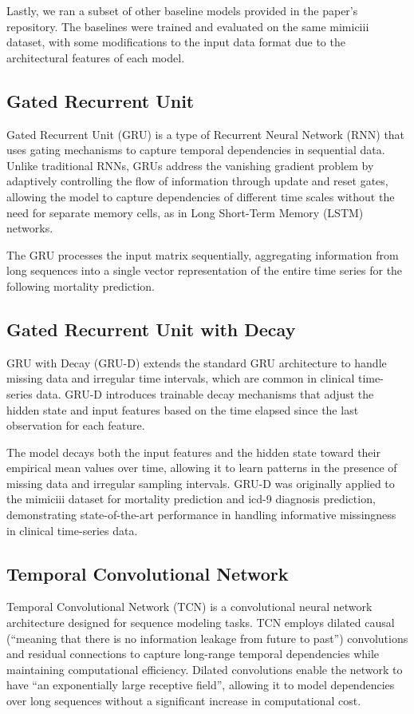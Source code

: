 Lastly, we ran a subset of other baseline models provided in the paper's repository. The baselines were trained and evaluated on the same \gls{mimiciii} dataset, with some modifications to the input data format due to the architectural features of each model.

\subsection{Gated Recurrent Unit}

Gated Recurrent Unit (GRU) \cite{gru,gru-evaluation} is a type of Recurrent Neural Network (RNN) that uses gating mechanisms to capture temporal dependencies in sequential data. Unlike traditional RNNs, GRUs address the vanishing gradient problem by adaptively controlling the flow of information through update and reset gates, allowing the model to capture dependencies of different time scales without the need for separate memory cells, as in Long Short-Term Memory (LSTM) networks.

The GRU processes the input matrix sequentially, aggregating information from long sequences into a single vector representation of the entire time series for the following mortality prediction.

\subsection{Gated Recurrent Unit with Decay}

GRU with Decay (GRU-D) \cite{GRUD2018} extends the standard GRU architecture to handle missing data and irregular time intervals, which are common in clinical time-series data. GRU-D introduces trainable decay mechanisms that adjust the hidden state and input features based on the time elapsed since the last observation for each feature.

The model decays both the input features and the hidden state toward their empirical mean values over time, allowing it to learn patterns in the presence of missing data and irregular sampling intervals. GRU-D was originally applied to the \gls{mimiciii} dataset for mortality prediction and \gls{icd}-9 diagnosis prediction, demonstrating state-of-the-art performance in handling informative missingness in clinical time-series data.

\subsection{Temporal Convolutional Network}
Temporal Convolutional Network (TCN) \cite{tcn} is a convolutional neural network architecture designed for sequence modeling tasks. TCN employs dilated causal  (``meaning that there is no information leakage from future to past'') convolutions and residual connections to capture long-range temporal dependencies while maintaining computational efficiency. Dilated convolutions enable the network to have ``an exponentially large receptive field'', allowing it to model dependencies over long sequences without a significant increase in computational cost.

